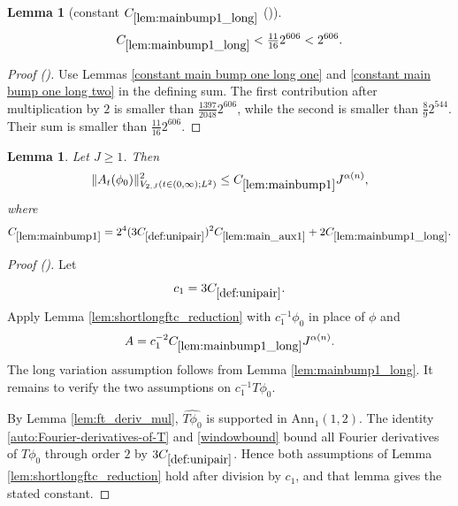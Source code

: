 \documentclass[12pt,reqno]{amsart}
\newcommand{\auto}{{({\tiny\faCar})}}
\theoremstyle{plain}
\newtheorem{lemma}[theorem]{Lemma}
\numberwithin{equation}{section}
\theoremstyle{remark}
\newcommand{\uses}[1]{}
\newcommand{\usesdefs}[1]{}
\begin{document}
\begin{lemma}[constant $C_{\ref{lem:mainbump1_long}}$ \auto]\label{constant main bump one long}\uses{constant main bump one long one,constant main bump one long two,lem:mainbump1_long}\usesdefs{}
\begin{equation}\label{constant main bump one long bound}
C_{\ref{lem:mainbump1_long}}<\tfrac{11}{16}2^{606}<2^{606}.
\end{equation}
\end{lemma}
\begin{proof}[Proof \auto]
Use Lemmas \ref{constant main bump one long one} and \ref{constant main bump one long two} in the defining sum. The first contribution after multiplication by $2$ is smaller than $\frac{1397}{2048}2^{606}$, while the second is smaller than $\frac89 2^{544}$. Their sum is smaller than $\frac{11}{16}2^{606}$.
\end{proof}

\begin{lemma}\label{lem:mainbump1}\uses{lem:shortlongftc_reduction,lem:mainbump1_long,lem:ft_deriv_mul}\usesdefs{A_def,def:cn-window,def:unipair}
Let $J\ge1$. Then
\begin{equation}\label{mainbump1}
\|A_t(\phi_0)\|_{V_{2,J}(t\in(0,\infty);L^2)}^2
\le C_{\ref{lem:mainbump1}}J^{\alpha(n)},
\end{equation}
where
\begin{equation}\label{auto:main-bump-one-constant-definition}
C_{\ref{lem:mainbump1}}
=2^4(3C_{\ref{def:unipair}})^2C_{\ref{lem:main_aux1}}
+2C_{\ref{lem:mainbump1_long}}.
\end{equation}
\end{lemma}

\begin{proof}[Proof \auto]
Let
\[
c_1=3C_{\ref{def:unipair}}.
\]
Apply Lemma \ref{lem:shortlongftc_reduction} with $c_1^{-1}\phi_0$ in place of $\phi$ and
\[
A=c_1^{-2}C_{\ref{lem:mainbump1_long}}J^{\alpha(n)}.
\]
The long variation assumption follows from Lemma \ref{lem:mainbump1_long}. It remains to verify the two assumptions on $c_1^{-1}T\phi_0$.

By Lemma \ref{lem:ft_deriv_mul}, $\widehat{T\phi_0}$ is supported in $\mathrm{Ann}_1(1,2)$. The identity \eqref{auto:Fourier-derivatives-of-T} and \eqref{windowbound} bound all Fourier derivatives of $T\phi_0$ through order $2$ by $3C_{\ref{def:unipair}}$. Hence both assumptions of Lemma \ref{lem:shortlongftc_reduction} hold after division by $c_1$, and that lemma gives the stated constant.
\end{proof}
\end{document}
